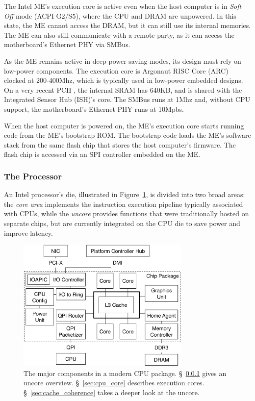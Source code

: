 The Intel ME's execution core is active even when the host computer is in
\textit{Soft Off} mode (ACPI G2/S5), where the CPU and DRAM are unpowered. In
this state, the ME cannot access the DRAM, but it can still use its internal
memories. The ME can also still communicate with a remote party, as it can
access the motherboard's Ethernet PHY via SMBus.

As the ME remains active in deep power-saving modes, its design must rely on
low-power components. The execution core is Argonaut RISC Core (ARC) clocked at
200-400Mhz, which is typically used in low-power embedded designs. On a very
recent PCH \cite{intel2015chipset}, the internal SRAM has 640KB, and is shared
with the Integrated Sensor Hub (ISH)'s core. The SMBus runs at 1Mhz and,
without CPU support, the motherboard's Ethernet PHY runs at 10Mpbs.

When the host computer is powered on, the ME's execution core starts running
code from the ME's bootstrap ROM. The bootstrap code loads the ME's software
stack from the same flash chip that stores the host computer's firmware. The
flash chip is accessed via an SPI controller embedded on the ME.


\subsubsection{The Processor}
\label{sec:cpu_die}

An Intel processor's die, illustrated in Figure~\ref{fig:cpu_die}, is divided
into two broad areas: the \textit{core area} implements the instruction
execution pipeline typically associated with CPUs, while the \textit{uncore}
provides functions that were traditionally hosted on separate chips, but are
currently integrated on the CPU die to save power and improve latency.

\begin{figure}[hbt]
  \centering
  \includegraphics[width=85mm]{figures/cpu_die.pdf}
  \caption{
    The major components in a modern CPU package. \S~\ref{sec:cpu_die} gives
    an uncore overview. \S~\ref{sec:cpu_core} describes execution cores.
    \S~\ref{sec:cache_coherence} takes a deeper look at the uncore.
  }
  \label{fig:cpu_die}
\end{figure}

